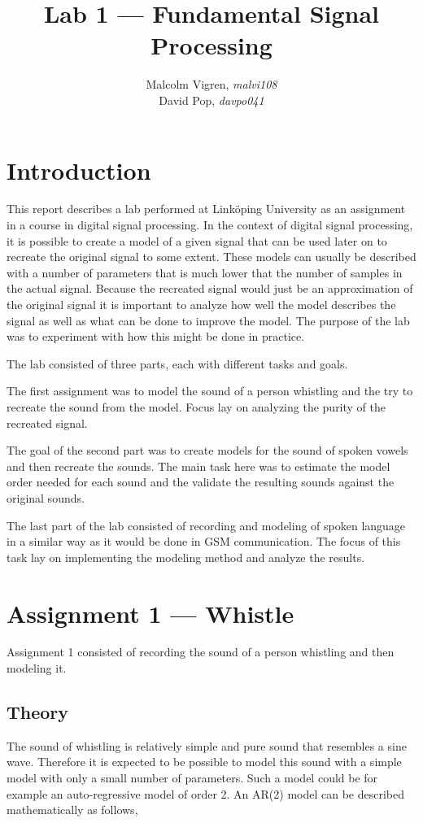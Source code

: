 \documentclass{IEEEtran}
\begin{document}
\title{Lab 1 --- Fundamental Signal Processing}
\author{Malcolm Vigren, \textit{malvi108} \\
        David Pop, \textit{davpo041}}

\maketitle

\section{Introduction}
This report describes a lab performed at Linköping University as an
assignment in a course in digital signal processing. In the context of
digital signal processing, it is possible to create a model of a given
signal that can be used later on to recreate the original signal to some
extent. These models can usually be described with a number of parameters
that is much lower that the number of samples in the actual signal. Because
the recreated signal would just be an approximation of the original signal
it is important to analyze how well the model describes the signal as well
as what can be done to improve the model. The purpose of the lab was
to experiment with how this might be done in practice.

The lab consisted of three parts, each with different tasks and
goals.

The first assignment was to model the sound of a person whistling and the
try to recreate the sound from the model. Focus lay on analyzing the purity
of the recreated signal.

The goal of the second part was to create models for the sound of spoken
vowels and then recreate the sounds. The main task here was to estimate
the model order needed for each sound and the validate the resulting
sounds against the original sounds.

The last part of the lab consisted of recording and modeling of
spoken language in a similar way as it would be done in GSM communication.
The focus of this task lay on implementing the modeling method and analyze
the results.

\section{Assignment 1 --- Whistle}
Assignment 1 consisted of recording the sound of a person whistling and then
modeling it.

\subsection{Theory}
\label{sec:whistletheory}
The sound of whistling is relatively simple and pure sound that resembles
a sine wave. Therefore it is expected to be possible to model this sound
with a simple model with only a small number of parameters. Such a model
could be for example an auto-regressive model of order 2. An AR(2) model
can be described mathematically as follows,
\end{document}
